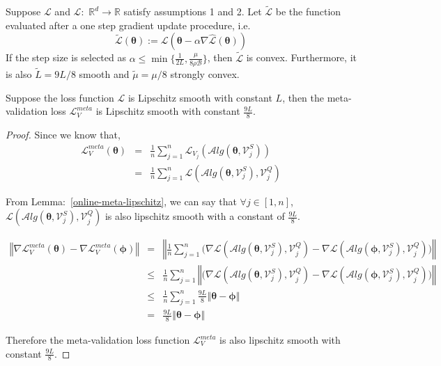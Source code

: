 \begin{lemma} {} \label{online-meta-lipschitz}
     Suppose $\mathcal{L}$ and $\hat{\mathcal{L}}:$ $\mathbb{R}^d \longrightarrow \mathbb{R}$ satisfy assumptions 1 and 2. Let $\tilde{\mathcal{L}}$ be the function evaluated after a one step gradient update procedure, i.e.
    $$
\tilde{\mathcal{L}}(\boldsymbol{\theta}):= \mathcal{L}(\boldsymbol{\theta} - \alpha \nabla \hat{\mathcal{L}}(\boldsymbol{\theta}))
$$
If the step size is selected as $\alpha \leq \min{\{\frac{1}{2L}, \frac{\mu}{8\rho \mathcal{B}}\}}$, then $\tilde{\mathcal{L}}$ is convex. Furthermore, it is also $\tilde{L}=9L/8$ smooth and $\tilde{\mu}=\mu/8$ strongly convex.\\
\end{lemma}

\begin{lemma} \label{meta-lipschitz}
Suppose the loss function $\mathcal{L}$ is Lipschitz smooth with constant $L$, then the meta-validation loss $\mathcal{L}_V^{meta}$ is Lipschitz smooth with constant $\frac{9L}{8}$.\\
\end{lemma}
\begin{proof}
Since we know that,
\begin{eqnarray}
    \mathcal{L}_{V}^{meta}(\boldsymbol{\theta}) &=& \frac{1}{n}\sum_{j=1}^{n}\mathcal{L}_{V_j}(\mathcal{A}lg(\boldsymbol{\theta},\mathcal{V}_j^{S})) \nonumber\\
    &=&\frac{1}{n}\sum_{j=1}^{n}\mathcal{L}(\mathcal{A}lg(\boldsymbol{\theta},\mathcal{V}_j^{S}), \mathcal{V}_j^{Q})
\end{eqnarray}

From Lemma:~\ref{online-meta-lipschitz}, we can say that $\forall{j \in [1, n]}$, $\mathcal{L}(\mathcal{A}lg(\boldsymbol{\theta},\mathcal{V}_j^{S}), \mathcal{V}_j^{Q})$ is also lipschitz smooth with a constant of $\frac{9L}{8}$.

\begin{eqnarray}
    \left\Vert\nabla\mathcal{L}_{V}^{meta}(\boldsymbol{\theta}) - \nabla\mathcal{L}_{V}^{meta}(\boldsymbol{\phi})\right\Vert 
    &=&\left\Vert\frac{1}{n}\sum_{j=1}^{n}\bigg(\nabla\mathcal{L}(\mathcal{A}lg(\boldsymbol{\theta},\mathcal{V}_j^{S}), \mathcal{V}_j^{Q}) -\nabla \mathcal{L}(\mathcal{A}lg(\boldsymbol{\phi},\mathcal{V}_j^{S}), \mathcal{V}_j^{Q})\bigg)\right\Vert \nonumber \\
    &\leq&\frac{1}{n}\sum_{j=1}^{n}\left\Vert\bigg(\nabla\mathcal{L}(\mathcal{A}lg(\boldsymbol{\theta},\mathcal{V}_j^{S}), \mathcal{V}_j^{Q}) -\nabla \mathcal{L}(\mathcal{A}lg(\boldsymbol{\phi},\mathcal{V}_j^{S}), \mathcal{V}_j^{Q})\bigg)\right\Vert \nonumber \\
    &\leq&\frac{1}{n}\sum_{j=1}^{n}\frac{9L}{8}\left\Vert \boldsymbol{\theta} - \boldsymbol{\phi}\right\Vert \nonumber \\
    &=&\frac{9L}{8}\left\Vert \boldsymbol{\theta} - \boldsymbol{\phi}\right\Vert
\end{eqnarray}

Therefore the meta-validation loss function $\mathcal{L}_V^{meta}$ is also lipschitz smooth with constant $\frac{9L}{8}$.
\end{proof}

